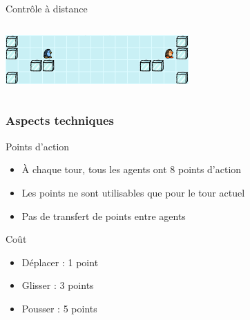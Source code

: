 \documentclass{beamer}
\begin{document}
\begin{frame}{Contrôle à distance}
\begin{columns}[T]
\begin{column}{0.7\textwidth}
{            \vspace{0.3cm}
            \includegraphics[width=7cm]{../img/push3}
        }
    \end{column}
    \end{columns}    
\end{frame}

\begin{frame}
    \frametitle{Aspects techniques}
    \begin{block}{Points d'action}
        \begin{itemize}
            \item À chaque tour, tous les agents ont 8 points d'action
            \item Les points ne sont utilisables que pour le tour actuel
            \item Pas de transfert de points entre agents
        \end{itemize}
    \end{block}
    \begin{block}{Coût}
        \begin{itemize}
            \item Déplacer : 1 point
            \item Glisser : 3 points
            \item Pousser : 5 points
        \end{itemize}
    \end{block}
\end{frame}
\end{document}
